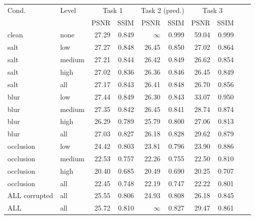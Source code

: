 \begin{tabular}{llrrrrrrrr}
\hline
Cond. & Level & \multicolumn{2}{c}{Task 1} & \multicolumn{2}{c}{Task 2 (pred.)} & \multicolumn{2}{c}{Task 3} \\
 & & PSNR & SSIM & PSNR & SSIM & PSNR & SSIM \\
\hline
clean & none & 27.29 & 0.849 & $\infty$ & 0.999 & 59.04 & 0.999 \\
salt & low & 27.27 & 0.848 & 26.45 & 0.850 & 27.02 & 0.864 \\
salt & medium & 27.21 & 0.844 & 26.42 & 0.849 & 26.62 & 0.854 \\
salt & high & 27.02 & 0.836 & 26.36 & 0.846 & 26.45 & 0.849 \\
salt & all & 27.17 & 0.843 & 26.41 & 0.848 & 26.70 & 0.856 \\
blur & low & 27.44 & 0.849 & 26.30 & 0.843 & 33.07 & 0.950 \\
blur & medium & 27.35 & 0.842 & 26.45 & 0.841 & 28.74 & 0.874 \\
blur & high & 26.29 & 0.789 & 25.79 & 0.800 & 27.06 & 0.813 \\
blur & all & 27.03 & 0.827 & 26.18 & 0.828 & 29.62 & 0.879 \\
occlusion & low & 24.42 & 0.803 & 23.81 & 0.796 & 23.90 & 0.886 \\
occlusion & medium & 22.53 & 0.757 & 22.26 & 0.755 & 22.50 & 0.810 \\
occlusion & high & 20.40 & 0.685 & 20.49 & 0.690 & 20.25 & 0.707 \\
occlusion & all & 22.45 & 0.748 & 22.19 & 0.747 & 22.22 & 0.801 \\
ALL corrupted & all & 25.55 & 0.806 & 24.93 & 0.808 & 26.18 & 0.845 \\
ALL & all & 25.72 & 0.810 & $\infty$ & 0.827 & 29.47 & 0.861 \\
\hline
\end{tabular}
